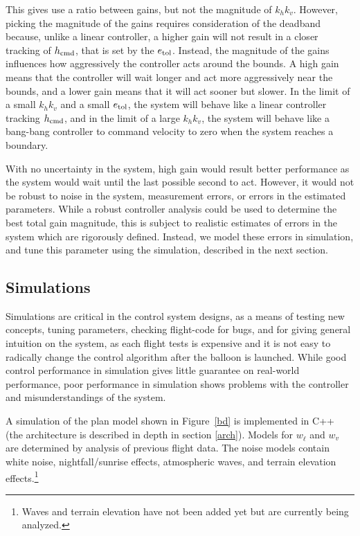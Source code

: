 \documentclass[11pt]{scrartcl} %
\begin{document}
This gives use a ratio between gains, but not the magnitude of $k_h k_v$. However, picking the magnitude of the gains requires consideration of the deadband because, unlike a linear controller, a higher gain will not result in a closer tracking of $h_{\mathrm{cmd}}$, that is set by the $e_{\mathrm{tol}}$. Instead, the magnitude of the gains influences how aggressively the controller acts around the bounds. A high gain means that the controller will wait longer and act more aggressively near the bounds, and a lower gain means that it will act sooner but slower. In the limit of a small $k_h k_v$ and a small $e_{\mathrm{tol}}$, the system will behave like a linear controller tracking $h_{\mathrm{cmd}}$, and in the limit of a large $k_h k_v$, the system will behave like a bang-bang controller to command velocity to zero when the system reaches a boundary.

With no uncertainty in the system, high gain would result better performance as the system would wait until the last possible second to act. However, it would not be robust to noise in the system, measurement errors, or errors in the estimated parameters. While a robust controller analysis could be used to determine the best total gain magnitude, this is subject to realistic estimates of errors in the system which are rigorously defined. Instead, we model these errors in simulation, and tune this parameter using the simulation, described in the next section.


\subsection{Simulations}
Simulations are critical in the control system designs, as a means of testing new concepts, tuning parameters, checking flight-code for bugs, and for giving general intuition on the system, as each flight tests is expensive and it is not easy to radically change the control algorithm after the balloon is launched. While good control performance in simulation gives little guarantee on real-world performance, poor performance in simulation shows problems with the controller and misunderstandings of the system.

A simulation of the plan model shown in Figure~\ref{bd} is implemented in C++ (the architecture is described in depth in section \ref{arch}). Models for $w_{\dot \ell}$ and $w_{v}$ are determined by analysis of previous flight data. The noise models contain white noise, nightfall/sunrise effects, atmospheric waves, and terrain elevation effects.\footnote{Waves and terrain elevation have not been added yet but are currently being analyzed.}
\end{document}

